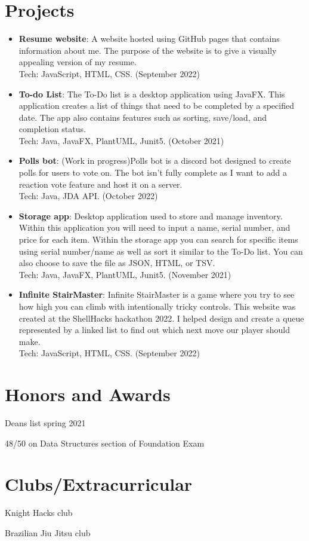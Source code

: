 \documentclass[a4paper,20pt]{article}
\newcommand{\resumeItem}[2]{
  \item\normalsize{
    \textbf{#1}{: #2 \vspace{1pt}}
  }
}
\newcommand{\resumeSubItem}[2]{\resumeItem{#1}{#2}\vspace{1pt}}
\newcommand{\resumeSubHeadingListStart}{\begin{itemize}[leftmargin=*]}
\newcommand{\resumeSubHeadingListEnd}{\end{itemize}}
\begin{document}
    
    \section{Projects}
        \resumeSubHeadingListStart
            \resumeSubItem{Resume website}{A website hosted using GitHub pages that contains information about me. The purpose of the website is to give a visually appealing version of my resume.\\Tech: JavaScript, HTML, CSS. (September 2022)}
            \resumeSubItem{To-do List}{The To-Do list is a desktop application using JavaFX. This application creates a list of things that need to be completed by a specified date. The app also contains features such as sorting, save/load, and completion status.  \\Tech: Java, JavaFX, PlantUML, Junit5. (October 2021)}
            \resumeSubItem{Polls bot}{(Work in progress)Polls bot is a discord bot designed to create polls for users to vote on. The bot isn't fully complete as I want to add a reaction vote feature and host it on a server.\\Tech: Java, JDA API. (October 2022)}
            \resumeSubItem{Storage app}{Desktop application used to store and manage inventory. Within this application you will need to input a name, serial number, and price for each item. Within the storage app you can search for specific items using serial number/name as well as sort it similar to the To-Do list. You can also choose to save the file as JSON, HTML, or TSV.  \\Tech: Java, JavaFX, PlantUML, Junit5. (November 2021)}
            \resumeSubItem{Infinite StairMaster}{Infinite StairMaster is a game where you try to see how high you can climb with intentionally tricky controls. This website was created at the ShellHacks hackathon 2022. I helped design and create a queue represented by a linked list to find out which next move our player should make. \\Tech: JavaScript, HTML, CSS. (September 2022)}
            \vspace{2pt}
        \resumeSubHeadingListEnd
    
    
    \section{Honors and Awards}
        \begin{description}[font=$\bullet$]
            \item {Deans list spring 2021}
            \item {48/50 on Data Structures section of Foundation Exam}
        \end{description}
        
    \section{Clubs/Extracurricular}
        \begin{description}[font=$\bullet$]
            \item {Knight Hacks club}
            \item {Brazilian Jiu Jitsu club}
        \end{description}
        
\end{document}
